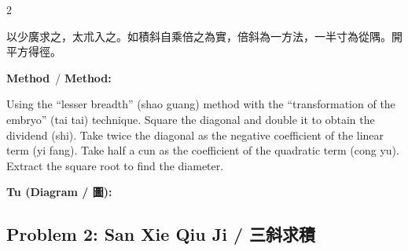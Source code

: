 \documentclass[11pt,a4paper]{article}
\newcommand{\meth}{\textbf{\color{methodcolor}Method}}
\begin{document}
\begin{paracol}{2}
\begin{leftcolumn*}
以少廣求之，太朮入之。如積斜自乘倍之為實，倍斜為一方法，一半寸為從隅。開平方得徑。
\end{leftcolumn*}

\begin{rightcolumn}
\meth\ / \textbf{Method:}

Using the ``lesser breadth'' (shao guang) method with the 
``transformation of the embryo'' (tai tai) technique. Square the diagonal 
and double it to obtain the dividend (shi). Take twice the diagonal as the 
negative coefficient of the linear term (yi fang). Take half a cun as the 
coefficient of the quadratic term (cong yu). Extract the square root to find 
the diameter.
\end{rightcolumn}

\end{paracol}

\vspace{0.5em}
\noindent\textbf{Tu (Diagram / 圖):}
\begin{center}
\end{center}

\vspace{1em}

\subsection*{Problem 2: San Xie Qiu Ji / 三斜求積}
\end{document}
